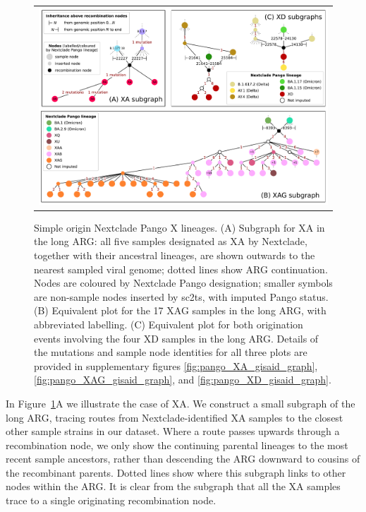 \documentclass{article}
\begin{document}
\begin{figure}
\begin{tabularx}{\textwidth}{c}


\includegraphics[width=\textwidth]{figures/Pango_XA_XAG_XD_nxcld_tight_graph.pdf}
\end{tabularx} \caption{\label{fig:pango-simple-origin-graph} Simple origin
Nextclade Pango X lineages. (A) Subgraph for XA in the long ARG: all five samples designated
as XA by Nextclade, together with their ancestral lineages, are shown outwards to the nearest
sampled viral genome; dotted lines show ARG continuation. Nodes are coloured by Nextclade
Pango designation; smaller symbols are non-sample nodes inserted by sc2ts, with
imputed Pango status. (B) Equivalent plot for the 17 XAG samples in the long ARG, with abbreviated labelling.
(C) Equivalent plot for both origination events involving the four XD samples in the long ARG. Details of the mutations and sample node identities for all three plots are provided in supplementary figures \ref{fig:pango_XA_gisaid_graph}, \ref{fig:pango_XAG_gisaid_graph}, and \ref{fig:pango_XD_gisaid_graph}.
} \end{figure}

In Figure~\ref{fig:pango-simple-origin-graph}A we illustrate the case of XA. We construct a small subgraph of the long ARG, tracing routes from Nextclade-identified XA samples to the closest other sample strains in our dataset. Where a route passes upwards through a recombination node, we only show the continuing parental lineages to the most recent sample ancestors, rather than descending the ARG downward to cousins of the recombinant parents. Dotted lines show where this subgraph links to other nodes within the ARG. It is clear from the subgraph that all the XA samples trace to a single originating recombination node.
\end{document}
